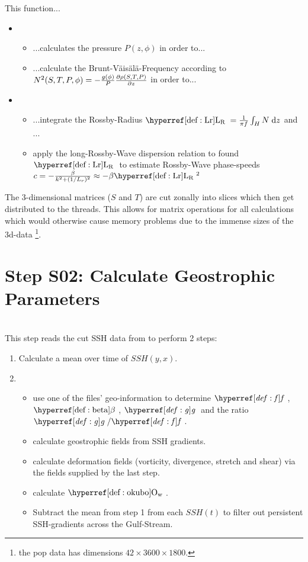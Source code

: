 This function...
\begin{itemize}
	\item
	\begin{itemize}
		\item
		...calculates the pressure $P(z,\phi)$ in order to...
		\item
		...calculate the Brunt-V\"ais\"al\"a-Frequency according to $N^{2}(S,T,P,\phi)=-\frac{g(\phi)}{P} \frac{\partial \rho(S,T,P)}{\partial z}$
		in order to...
	\end{itemize}
	\item
	\begin{itemize}
		\item
		...integrate the Rossby-Radius $\Lr=\frac{1}{\pi f}\INT{H}{ }{N}{z}$ and ...
		\item
		apply the long-Rossby-Wave dispersion relation to found $\Lr$ to estimate Rossby-Wave phase-speeds $c=-\frac{\beta}{k^2+(1/L_r)^2} \approx -\beta \Lr^2$
	\end{itemize}
\end{itemize}

The 3-dimensional matrices ($S$ and $T$) are cut zonally into slices which then get distributed to the threads. This allows for matrix operations for all calculations which would otherwise cause memory problems due to the immense sizes of the 3d-data \footnote{\Eg the pop data has dimensions $42 \times 3600 \times 1800 $.}.
\section{Step S02: Calculate Geostrophic Parameters}
\\
This step reads the cut SSH data from  to perform 2 steps:
\begin{enumerate}
\item
Calculate a mean over time of $SSH(y,x)$.
	\item
\begin{itemize}
	\item  use one of the files' geo-information to determine $\f$, $\dfdy$,
$\g$ and the ratio $\g/\f$.
\item
 calculate geostrophic fields from SSH gradients.
 \item
 calculate deformation fields (vorticity, divergence, stretch and shear) via the
fields supplied by the last step.
\item calculate $\okubo$.
\item
Subtract the mean from step 1 from each $SSH(t)$ to filter out persistent SSH-gradients \eg across the Gulf-Stream.
\end{itemize}
\end{enumerate}

